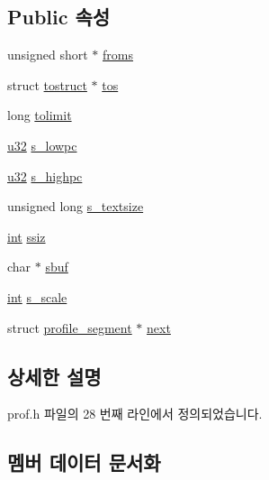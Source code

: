 \subsection*{Public 속성}
\begin{DoxyCompactItemize}
\item 
unsigned short $\ast$ \mbox{\hyperlink{structprofile__segment_a95f5dd8cfc985546636f224205f13d63}{froms}}
\item 
struct \mbox{\hyperlink{structtostruct}{tostruct}} $\ast$ \mbox{\hyperlink{structprofile__segment_abef295486183253034168e0b10ab0145}{tos}}
\item 
long \mbox{\hyperlink{structprofile__segment_ae05a2e4cec6f5e9b4d09617b1dd14154}{tolimit}}
\item 
\mbox{\hyperlink{_system_8h_a10e94b422ef0c20dcdec20d31a1f5049}{u32}} \mbox{\hyperlink{structprofile__segment_aa8ee9d63ea20e39b677163d2de599c0a}{s\+\_\+lowpc}}
\item 
\mbox{\hyperlink{_system_8h_a10e94b422ef0c20dcdec20d31a1f5049}{u32}} \mbox{\hyperlink{structprofile__segment_a7f09373641edd894f53bc8eb0133698e}{s\+\_\+highpc}}
\item 
unsigned long \mbox{\hyperlink{structprofile__segment_abdd1f062a546f1deae937249beff75e0}{s\+\_\+textsize}}
\item 
\mbox{\hyperlink{_util_8cpp_a0ef32aa8672df19503a49fab2d0c8071}{int}} \mbox{\hyperlink{structprofile__segment_abb1125e53b4e5c215e7a9d3fccbd0a37}{ssiz}}
\item 
char $\ast$ \mbox{\hyperlink{structprofile__segment_a62d09b5209cad3577bfdd8b5b664c429}{sbuf}}
\item 
\mbox{\hyperlink{_util_8cpp_a0ef32aa8672df19503a49fab2d0c8071}{int}} \mbox{\hyperlink{structprofile__segment_a4fafbba78188d70492831e298d7d42fc}{s\+\_\+scale}}
\item 
struct \mbox{\hyperlink{structprofile__segment}{profile\+\_\+segment}} $\ast$ \mbox{\hyperlink{structprofile__segment_a105e1835554471470a91583c6da7860e}{next}}
\end{DoxyCompactItemize}


\subsection{상세한 설명}


prof.\+h 파일의 28 번째 라인에서 정의되었습니다.



\subsection{멤버 데이터 문서화}
\mbox{\label{structprofile__segment_a95f5dd8cfc985546636f224205f13d63}} 
